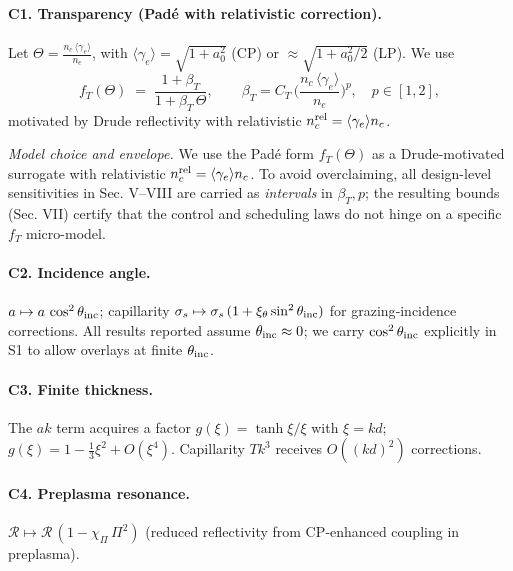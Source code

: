 \documentclass[aps,pre,twocolumn,showpacs,superscriptaddress]{revtex4-2}
\theoremstyle{definition}
\begin{document}
\paragraph{C1. Transparency (Pad\'e with relativistic correction).}
Let $\Theta=\frac{n_c\,\langle\gamma_e\rangle}{n_e}$, with $\langle\gamma_e\rangle=\sqrt{1+a_0^2}$ (CP) or $\approx\sqrt{1+a_0^2/2}$ (LP). We use
\begin{equation}\label{eq:transPade}
f_T(\Theta)\;=\;\frac{1+\beta_T}{1+\beta_T\,\Theta},\qquad 
\beta_T=C_T\,\Big(\frac{n_c\,\langle\gamma_e\rangle}{n_e}\Big)^{p},\quad p\in[1,2],
\end{equation}
motivated by Drude reflectivity with relativistic $n_c^{\rm rel}=\langle\gamma_e\rangle n_c$.

\emph{Model choice and envelope.}
We use the Padé form $f_T(\Theta)$ as a Drude-motivated surrogate with relativistic $n_c^{\rm rel}=\langle\gamma_e\rangle n_c$. 
To avoid overclaiming, all design-level sensitivities in Sec. V–VIII are carried as \emph{intervals} in $\beta_T,p$; the resulting bounds (Sec. VII) certify that the control and scheduling laws do not hinge on a specific $f_T$ micro-model.

\paragraph{C2. Incidence angle.}
$a\mapsto a\,\cos^2\theta_{\rm inc}$; capillarity $\sigma_s\mapsto \sigma_s\,(1+\xi_\theta\sin^2\theta_{\rm inc})$ for grazing‑incidence corrections. All results reported assume $\theta_{\rm inc} \approx 0$; we carry $\cos^2\theta_{\rm inc}$ explicitly in S1 to allow overlays at finite $\theta_{\rm inc}$.

\paragraph{C3. Finite thickness.}
The $ak$ term acquires a factor $g(\xi)=\tanh\xi/\xi$ with $\xi=kd$; $g(\xi)=1-\tfrac13\xi^2+O(\xi^4)$. Capillarity $Tk^3$ receives $O((kd)^2)$ corrections.

\paragraph{C4. Preplasma resonance.}
$\mathcal{R}\mapsto \mathcal{R}\,(1-\chi_\Pi\,\Pi^2)$ (reduced reflectivity from CP‑enhanced coupling in preplasma).
\end{document}
